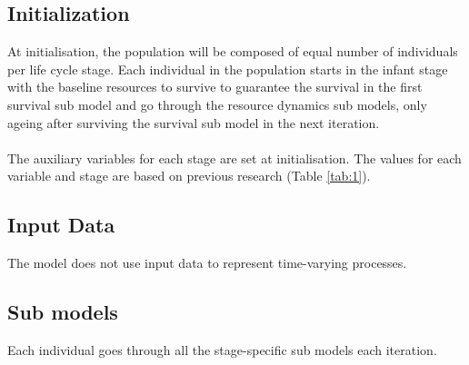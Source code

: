 \documentclass{article}
\begin{document}
\subsection{Initialization}

At initialisation, the population will be composed of equal number of individuals per life cycle stage. Each individual in the population starts in the infant stage with the baseline resources to survive to guarantee the survival in the first survival sub model and go through the resource dynamics sub models, only ageing after surviving the survival sub model in the next iteration.
\\\\
The auxiliary variables for each stage are set at initialisation. The values for each variable and stage are based on previous research (Table \ref{tab:1}).

\subsection{Input Data}

The model does not use input data to represent time-varying processes.

\subsection{Sub models}

Each individual goes through all the stage-specific sub models each iteration.
\end{document}

